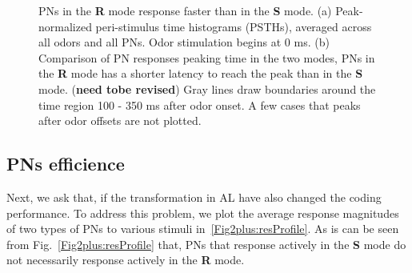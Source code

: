 \documentclass[12pt, a4paper]{article}
\begin{document}
\begin{figure}[htbp]\centering
    \hspace{0.5cm}
    \caption[Peak~eariler]{\label{Figure1:peakEariler} \small PNs in the {\bf R} mode response faster than in the {\bf S} mode.
    (a) Peak-normalized peri-stimulus time histograms (PSTHs), averaged across all odors and all PNs. Odor stimulation begins at 0 ms. (b) Comparison of PN responses peaking time in the two modes, PNs in the {\bf R} mode has a shorter latency to reach the peak than in the {\bf S} mode. ({\bf need tobe revised}) Gray lines draw boundaries around the time region 100 - 350 ms after odor onset. A few cases that peaks after odor offsets are not plotted.
    }
\end{figure}

\subsection{PNs efficience} \label{Sect:PNefficience}
Next, we ask that, if the transformation in AL have also changed the coding performance. To address this problem, we plot the average response magnitudes of two types of PNs to various stimuli in~\ref{Fig2plus:resProfile}. As is can be seen from Fig.~\ref{Fig2plus:resProfile} that, PNs that response actively in the {\bf S} mode do not necessarily response actively in the {\bf R} mode.
\end{document}
